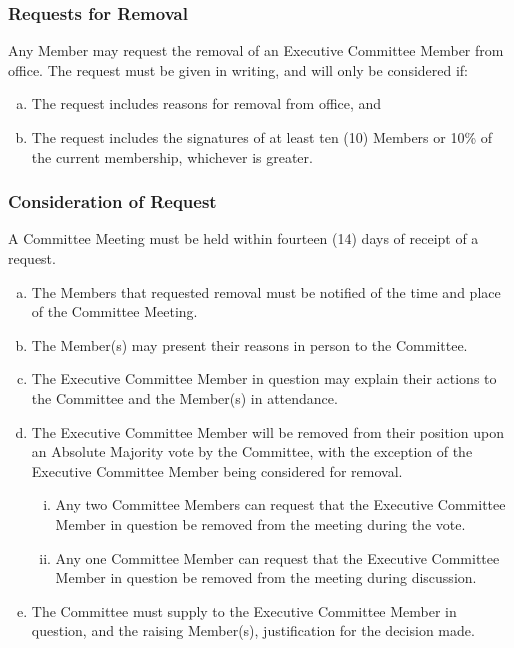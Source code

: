 \documentclass[a4paper,12pt]{article}
\begin{document}
\subsubsection{Requests for Removal}

Any Member may request the removal of an Executive Committee Member from office. The request must be given in writing, and will only be considered if:

\begin{enumerate}[a)]
	\item The request includes reasons for removal from office, and
	\item The request includes the signatures of at least ten (10) Members or 10\% of the current membership, whichever is greater.
\end{enumerate}

\subsubsection{Consideration of Request}

A Committee Meeting must be held within fourteen (14) days of receipt of a request.

\begin{enumerate}[a)]
	\item The Members that requested removal must be notified of the time and place of the Committee Meeting.
	\item The Member(s) may present their reasons in person to the Committee.
	\item The Executive Committee Member in question may explain their actions to the Committee and the Member(s) in attendance.
	\item The Executive Committee Member will be removed from their position upon an Absolute Majority vote by the Committee, with the exception of the Executive Committee Member being considered for removal.
	\begin{enumerate}[i)]
		\item Any two Committee Members can request that the Executive Committee Member in question be removed from the meeting during the vote.
		\item Any one Committee Member can request that the Executive Committee Member in question be removed from the meeting during discussion.
	\end{enumerate}
	\item The Committee must supply to the Executive Committee Member in question, and the raising Member(s), justification for the decision made.
\end{enumerate}
\end{document}
